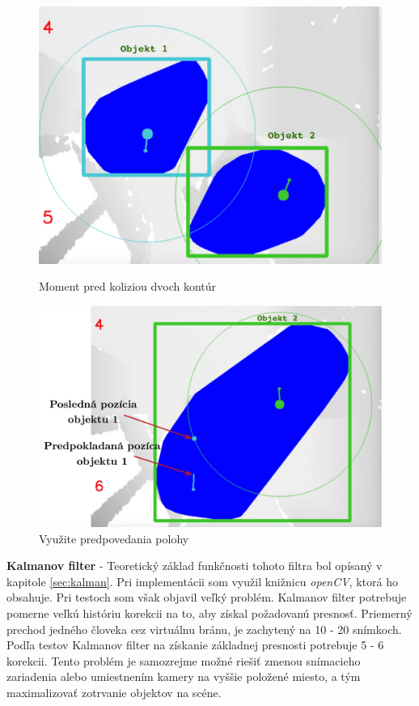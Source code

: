 \begin{figure}[H]
  \centering
  \begin{minipage}[b]{0.4\textwidth}
    \includegraphics[width=\textwidth]{images/beforeCollision}
    \caption{Moment pred koliziou dvoch kontúr}
  \end{minipage}
  \hfill
  \begin{minipage}[b]{0.55\textwidth}
    \includegraphics[width=\textwidth]{images/predicate}
    \caption{Využite predpovedania polohy}
  \end{minipage}
\end{figure}



\textbf{Kalmanov filter} - Teoretický základ funkčnosti tohoto filtra bol opísaný v kapitole \ref{sec:kalman}. Pri implementácii som využil knižnicu \textit{openCV}, ktorá ho obsahuje. Pri testoch som však objavil veľký problém. Kalmanov filter potrebuje pomerne veľkú históriu korekcii na to, aby získal požadovanú presnosť. Priemerný prechod jedného človeka cez virtuálnu bránu, je zachytený na 10 - 20 snímkoch. Podľa testov Kalmanov filter na získanie základnej presnosti potrebuje 5 - 6 korekcii. Tento problém je samozrejme možné riešiť zmenou snímacieho zariadenia alebo umiestnením kamery na vyššie položené miesto, a tým maximalizovať zotrvanie objektov na scéne. 

